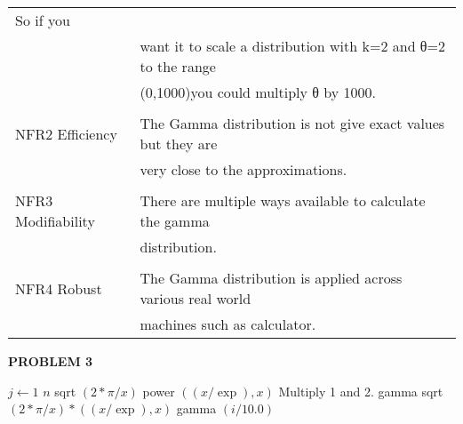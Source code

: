 \documentclass[11pt]{article}
\begin{document}
\begin{table}[h!]
\begin{center}
{\begin{tabular}{ l| l  }
So if you \\ & want it to scale a distribution with k=2 and θ=2 to the range \\ &  (0,1000)you could multiply θ by 1000.\\
\hline
\newline & \newline\\
NFR2 Efficiency & The Gamma distribution is not give exact values but they are \\ &  very close to the approximations.\\
\hline
\newline & \newline\\
NFR3 Modifiability & There are multiple ways available to calculate the gamma\\ & distribution.\\
\hline
\newline & \newline\\
NFR4 Robust	& The Gamma distribution is applied across various real world\\ & machines such as calculator.
\end{tabular}}
	\end{center}
\end{table}

\newpage
{\bfseries{PROBLEM 3 } }
\newline
\begin{codebox}
	\li \For $j \gets 1$ \To $n$
	\li  sqrt $(2 * \pi / x) $   
	\li  power $((x / \exp),  x)$
	\li \Comment Multiply 1 and 2.
	\li gamma \gets sqrt $(2 * \pi / x)    * ((x / \exp),  x)$
	\li gamma $(i/10.0)$
	\End
\end{codebox}
\end{document}
